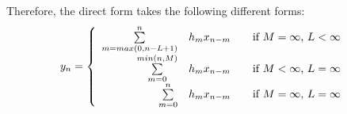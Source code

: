 Therefore, the direct form takes the following different forms:
\[
	y_n =
		\left\{
			\begin{array}{r l l}
				\sum\limits_{m=max(0,n-L+1)}^{n} & h_m x_{n-m}		& \quad \text{if $M = \infty$, $L < \infty$} \\	
				\sum\limits_{m=0}^{min(n,M)} & h_m x_{n-m}		& \quad \text{if $M < \infty$, $L = \infty$ } \\
				\sum\limits_{m=0}^{n} & h_m x_{n-m}	& \quad \text{if $M = \infty$, $L = \infty$ }
			\end{array}
		\right.
\]




	
	